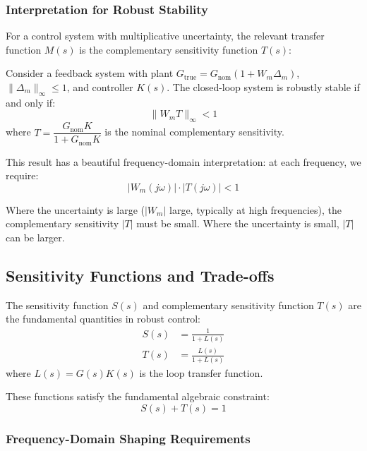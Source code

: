 \subsubsection{Interpretation for Robust Stability}

For a control system with multiplicative uncertainty, the relevant transfer function $M(s)$ is the complementary sensitivity function $T(s)$:

\begin{theorem}
\label{thm:robust_stab_mult}
Consider a feedback system with plant $G_{\text{true}} = G_{\text{nom}}(1 + W_m\Delta_m)$, $\|\Delta_m\|_\infty \leq 1$, and controller $K(s)$. The closed-loop system is robustly stable if and only if:
\begin{equation}
\|W_m T\|_\infty < 1
\label{eq:robust_stab_mult}
\end{equation}
where $T = \dfrac{G_{\text{nom}} K}{1 + G_{\text{nom}} K}$ is the nominal complementary sensitivity.
\end{theorem}

This result has a beautiful frequency-domain interpretation: at each frequency, we require:
\begin{equation}
|W_m(j\omega)| \cdot |T(j\omega)| < 1
\end{equation}

Where the uncertainty is large ($|W_m|$ large, typically at high frequencies), the complementary sensitivity $|T|$ must be small. Where the uncertainty is small, $|T|$ can be larger.

\subsection{Sensitivity Functions and Trade-offs}
\label{subsec:sensitivity}

The sensitivity function $S(s)$ and complementary sensitivity function $T(s)$ are the fundamental quantities in robust control:
\begin{align}
S(s) &= \frac{1}{1 + L(s)} \\
T(s) &= \frac{L(s)}{1 + L(s)}
\end{align}
where $L(s) = G(s)K(s)$ is the loop transfer function.

These functions satisfy the fundamental algebraic constraint:
\begin{equation}
S(s) + T(s) = 1
\label{eq:ST_identity}
\end{equation}

\subsubsection{Frequency-Domain Shaping Requirements}


